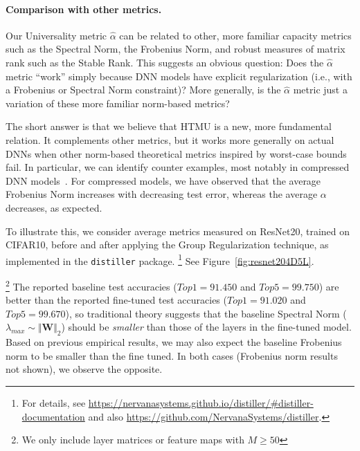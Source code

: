 \paragraph{Comparison with other metrics.}
Our Universality metric $\hat{\alpha}$ can be related to other, more familiar capacity metrics such as the Spectral Norm, the Frobenius Norm, and robust measures of matrix rank such as the Stable Rank.
This suggests an obvious question: 
Does the $\hat{\alpha}$ metric ``work'' simply because DNN models have explicit regularization (i.e., with a Frobenius or Spectral Norm constraint)?
More generally, is the $\hat{\alpha}$ metric just a variation of these more familiar norm-based metrics?  

The short answer is that we believe that HTMU is a new, more fundamental relation. 
It complements other metrics, but it works more generally on actual DNNs when other norm-based theoretical metrics inspired by worst-case bounds fail. 
In particular, we can identify counter examples, most notably in compressed DNN models~\cite{CWZZ17_TR}.
For compressed models, we have observed that the average Frobenius Norm increases with decreasing test error, whereas the average $\alpha$ decreases, as expected.  


To illustrate this, we consider average metrics measured on ResNet20, trained on CIFAR10, before and after applying the Group Regularization technique, 
as implemented in the \texttt{distiller} package.%
\footnote{For details, see \url{https://nervanasystems.github.io/distiller/\#distiller-documentation} and also \url{https://github.com/NervanaSystems/distiller}.}
See Figure~\ref{fig:resnet204D5L}.

\footnote{We only include layer matrices or feature maps with  $M\ge50$}
The reported baseline  test accuracies ($Top1=91.450$ and $Top5=99.750$)
are better than the reported fine-tuned test accuracies ($Top1=91.020$ and $Top5=99.670$), so traditional theory suggests that the baseline Spectral Norm
($\lambda_{max}\sim\Vert\mathbf{W}\Vert_{2}$) should be \emph{smaller} than those of the layers in the fine-tuned model.
Based on previous empirical results, we may also expect the baseline Frobenius norm to be smaller than the fine tuned. 
In both cases (Frobenius norm results not shown), we observe the opposite.

